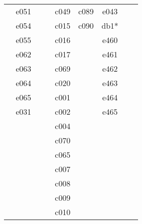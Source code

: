 \documentclass[10pt,letterpaper]{article}
\begin{document}
\begin{center}
\begin{tabular}{ |c|c|c|c|c|c|c|c|c| }
        & e051 &         &         & c049 & c089       & e043 &         &         \\
        & e054 &         &         & c015 & c090       & db1* &         &         \\
        & e055 &         &         & c016 &            & e460 &         &         \\
        & e062 &         &         & c017 &            & e461 &         &         \\
        & e063 &         &         & c069 &            & e462 &         &         \\
        & e064 &         &         & c020 &            & e463 &         &         \\
        & e065 &         &         & c001 &            & e464 &         &         \\
        & e031 &         &         & c002 &            & e465 &         &         \\
        &      &         &         & c004 &            &      &         &         \\
        &      &         &         & c070 &            &      &         &         \\
        &      &         &         & c065 &            &      &         &         \\
        &      &         &         & c007 &            &      &         &         \\
        &      &         &         & c008 &            &      &         &         \\
        &      &         &         & c009 &            &      &         &         \\
        &      &         &         & c010 &            &      &         &         \\


        \hline
        \end{tabular}
        \end{center}
\end{document}
